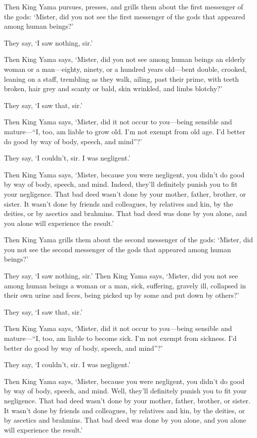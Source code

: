 \documentclass[12pt,openany]{book}%
\begin{document}
Then King Yama pursues, presses, and grills them about the first messenger of the gods: ‘Mister, did you not see the first messenger of the gods that appeared among human beings?’ 

They say, ‘I saw nothing, sir.’ 

Then King Yama says, ‘Mister, did you not see among human beings an elderly woman or a man—eighty, ninety, or a hundred years old—bent double, crooked, leaning on a staff, trembling as they walk, ailing, past their prime, with teeth broken, hair grey and scanty or bald, skin wrinkled, and limbs blotchy?’ 

They say, ‘I saw that, sir.’ 

Then King Yama says, ‘Mister, did it not occur to you—being sensible and mature—“I, too, am liable to grow old. I’m not exempt from old age. I’d better do good by way of body, speech, and mind”?’ 

They say, ‘I couldn’t, sir. I was negligent.’ 

Then King Yama says, ‘Mister, because you were negligent, you didn’t do good by way of body, speech, and mind. Indeed, they’ll definitely punish you to fit your negligence. That bad deed wasn’t done by your mother, father, brother, or sister. It wasn’t done by friends and colleagues, by relatives and kin, by the deities, or by ascetics and brahmins. That bad deed was done by you alone, and you alone will experience the result.’ 

Then King Yama grills them about the second messenger of the gods: ‘Mister, did you not see the second messenger of the gods that appeared among human beings?’ 

They say, ‘I saw nothing, sir.’ Then King Yama says, ‘Mister, did you not see among human beings a woman or a man, sick, suffering, gravely ill, collapsed in their own urine and feces, being picked up by some and put down by others?’ 

They say, ‘I saw that, sir.’ 

Then King Yama says, ‘Mister, did it not occur to you—being sensible and mature—“I, too, am liable to become sick. I’m not exempt from sickness. I’d better do good by way of body, speech, and mind”?’ 

They say, ‘I couldn’t, sir. I was negligent.’ 

Then King Yama says, ‘Mister, because you were negligent, you didn’t do good by way of body, speech, and mind. Well, they’ll definitely punish you to fit your negligence. That bad deed wasn’t done by your mother, father, brother, or sister. It wasn’t done by friends and colleagues, by relatives and kin, by the deities, or by ascetics and brahmins. That bad deed was done by you alone, and you alone will experience the result.’ 
\end{document}
